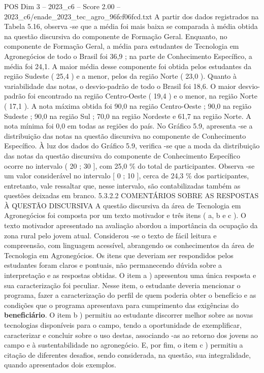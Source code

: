 \begin{textsample}{POS Dim 3 – 2023\_c6 – Score 2.00 – 2023\_c6/enade\_2023\_tec\_agro\_96fcf06fcd.txt}
A partir dos dados registrados na Tabela 5.16, observa -se que a média foi mais baixa se comparada à média obtida na questão discursiva do componente de Formação Geral.
Enquanto, no componente de Formação Geral, a média para estudantes de Tecnologia em Agronegócios de todo o Brasil foi 36,9 ; na parte de Conhecimento Específico, a média foi 24,1.
A maior média desse componente foi obtida pelos estudantes da região Sudeste ( 25,4 ) e a menor, pelos da região Norte ( 23,0 ).
Quanto à variabilidade das notas, o desvio-padrão de todo o Brasil foi 18,6.
O maior desvio-padrão foi encontrado na região Centro-Oeste ( 19,4 ) e o menor, na região Norte ( 17,1 ).
A nota máxima obtida foi 90,0 na região Centro-Oeste ; 90,0 na região Sudeste ; 90,0 na região Sul ; 70,0 na região Nordeste e 61,7 na região Norte.
A nota mínima foi 0,0 em todas as regiões do país.
No Gráfico 5.9, apresenta -se a distribuição das notas na questão discursiva no componente de Conhecimento Específico.
À luz dos dados do Gráfico 5.9, verifica -se que a moda da distribuição das notas da questão discursiva do componente de Conhecimento Específico ocorre no intervalo ( 20 ; 30 ], com 25,0 \% do total de participantes.
Observa -se um valor considerável no intervalo [ 0 ; 10 ], cerca de 24,3 \% dos participantes, entretanto, vale ressaltar que, nesse intervalo, são contabilizadas também as questões deixadas em branco. 5.3.2.2 COMENTÁRIOS SOBRE AS RESPOSTAS À QUESTÃO DISCURSIVA A questão discursiva da área de Tecnologia em Agronegócios foi composta por um texto motivador e três itens ( a, b e c ).
O texto motivador apresentado na avaliação abordou a importância da ocupação da zona rural pelo jovem atual.
Considerou -se o texto de fácil leitura e compreensão, com linguagem acessível, abrangendo os conhecimentos da área de Tecnologia em Agronegócios.
Os itens que deveriam ser respondidos pelos estudantes foram claros e pontuais, não permanecendo dúvida sobre a interpretação e as respostas obtidas.
O item a ) apresentou uma única resposta e sua caracterização foi peculiar.
Nesse item, o estudante deveria mencionar o programa, fazer a caracterização do perfil de quem poderia obter o benefício e as condições que o programa apresentava para cumprimento das exigências do \textbf{beneficiário}.
O item b ) permitiu ao estudante discorrer melhor sobre as novas tecnologias disponíveis para o campo, tendo a oportunidade de exemplificar, caracterizar e concluir sobre o uso destas, associando -as ao retorno dos jovens ao campo e à sustentabilidade no agronegócio.
E, por fim, o item c ) permitiu a citação de diferentes desafios, sendo considerada, na questão, sua integralidade, quando apresentados dois exemplos.

\end{textsample}
